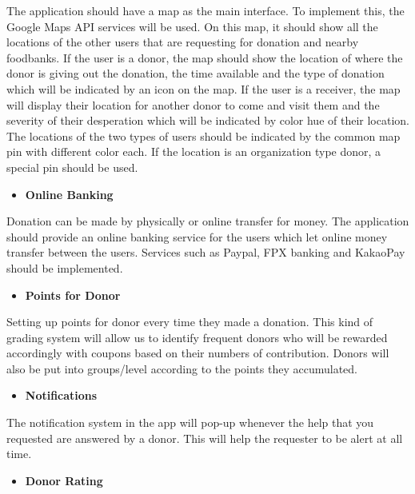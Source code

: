 \documentclass[conference]{IEEEtran}
\begin{document}
\par The application should have a map as the main interface. To implement this, the Google Maps API services will be used. On this map, it should show all the locations of the other users that are requesting for donation and nearby foodbanks. If the user is a donor, the map should show the location of where the donor is giving out the donation, the time available and the type of donation which will be indicated by an icon on the map. If the user is a receiver, the map will display their location for another donor to come and visit them and the severity of their desperation which will be indicated by color hue of their location. The locations of the two types of users should be indicated by the common map pin with different color each. If the location is an organization type donor, a special pin should be used.\\
\begin{itemize}
\item \textbf{Online Banking}
\end{itemize}
\par Donation can be made by physically or online transfer for money. The application should provide an online banking service for the users which let online money transfer between the users. Services such as Paypal, FPX banking and KakaoPay should be implemented.\\
\begin{itemize}
\item \textbf{Points for Donor}
\end{itemize}
\par Setting up points for donor every time they made a donation. This kind of grading system will allow us to identify frequent donors who will be rewarded accordingly with coupons based on their numbers of contribution. Donors will also be put into groups/level according to the points they accumulated.\\
\begin{itemize}
\item \textbf{Notifications}
\end{itemize}
\par The notification system in the app will pop-up whenever the help that you requested are answered by a donor. This will help the requester to be alert at all time.\\
\begin{itemize}
\item \textbf{Donor Rating}
\end{itemize}
\end{document}
